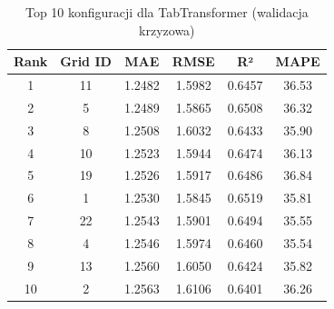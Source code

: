 \begin{table}[h]
\centering
\caption{Top 10 konfiguracji dla TabTransformer (walidacja krzyzowa)}
\label{tab:cv_results_tabtransformer}
\small
\begin{tabular}{cccccc}
\toprule
Rank & Grid ID & MAE & RMSE & R² & MAPE \\
\midrule
1 & 11 & 1.2482 & 1.5982 & 0.6457 & 36.53 \\
2 & 5 & 1.2489 & 1.5865 & 0.6508 & 36.32 \\
3 & 8 & 1.2508 & 1.6032 & 0.6433 & 35.90 \\
4 & 10 & 1.2523 & 1.5944 & 0.6474 & 36.13 \\
5 & 19 & 1.2526 & 1.5917 & 0.6486 & 36.84 \\
6 & 1 & 1.2530 & 1.5845 & 0.6519 & 35.81 \\
7 & 22 & 1.2543 & 1.5901 & 0.6494 & 35.55 \\
8 & 4 & 1.2546 & 1.5974 & 0.6460 & 35.54 \\
9 & 13 & 1.2560 & 1.6050 & 0.6424 & 35.82 \\
10 & 2 & 1.2563 & 1.6106 & 0.6401 & 36.26 \\
\bottomrule
\end{tabular}
\end{table}
